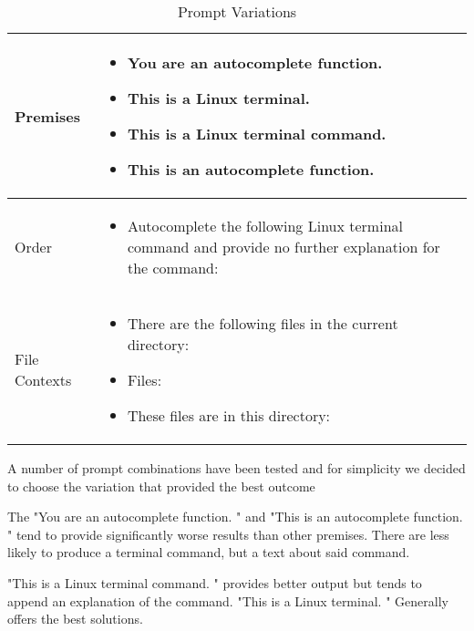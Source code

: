   



\begin{table}[htbp]
    \centering
    \caption{Prompt Variations}
    \begin{tabular}{|p{5cm}|p{8cm}|}
        \hline
        Premises & 
        \begin{itemize}
            \item You are an autocomplete function.
            \item This is a Linux terminal.
            \item This is a Linux terminal command.
            \item This is an autocomplete function.
        \end{itemize}
        \\
        \hline
        Order & 
        \begin{itemize}
            \item Autocomplete the following Linux terminal command and provide no further explanation for the command:
        \end{itemize}
        \\
        \hline
        File Contexts & 
        \begin{itemize}
            \item There are the following files in the current directory:
            \item Files:
            \item These files are in this directory:
        \end{itemize}
        \\
        \hline
    \end{tabular}
\end{table}


 

A number of prompt combinations have been tested and for simplicity we decided to choose the variation that provided the best outcome 



The "You are an autocomplete function. " and "This is an autocomplete function. " tend to provide significantly worse results than other premises. There are less likely to produce a terminal command, but a text about said command.


"This is a Linux terminal command. " provides better output but tends to append an explanation of the command. "This is a Linux terminal. " Generally offers the best solutions. 




